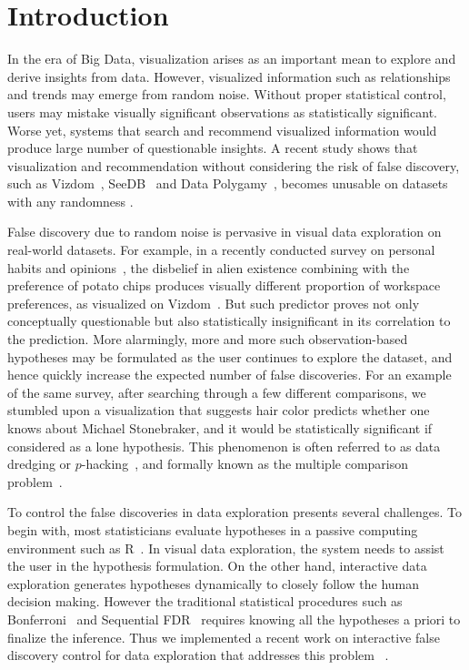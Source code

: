 \section{Introduction}
\label{sec:intro}
 In the era of Big Data, visualization arises as an important mean to explore and derive insights from data.  However, visualized information such as relationships and trends may emerge from random noise.  Without proper statistical control, users may mistake visually significant observations as statistically significant.  Worse yet, systems that search and recommend visualized information would produce large number of questionable insights.  
A recent study shows that visualization and recommendation without considering the risk of false discovery, such as Vizdom~\cite{vizdom}, SeeDB~\cite{seedb} and Data Polygamy~\cite{polygamy}, becomes unusable on datasets with any randomness \cite{towards-sustainable-insight}.

 False discovery due to random noise is pervasive in visual data exploration on real-world datasets. For example, in a recently conducted survey on personal habits and opinions~\cite{towards-sustainable-insight}, the disbelief in alien existence combining with the preference of potato chips produces visually different proportion of workspace preferences, as visualized on Vizdom~\cite{vizdom}.  But such predictor proves not only conceptually questionable but also statistically insignificant in its correlation to the prediction.  More alarmingly, more and more such observation-based hypotheses may be formulated as the user continues to explore the dataset, and hence quickly increase the expected number of false discoveries. For an example of the same survey, after searching through a few different comparisons, we stumbled upon a visualization that suggests hair color predicts whether one knows about Michael Stonebraker, and it would be statistically significant if considered as a lone hypothesis. This phenomenon is often referred to as data dredging or $p$-hacking~\cite{p-hacking}, and formally known as the multiple comparison problem~\cite{shaffer1995multiple}.

To control the false discoveries in data exploration presents several challenges.  To begin with, most statisticians evaluate hypotheses in a passive computing environment such as R~\cite{R}. In visual data exploration, the system needs to assist the user in the hypothesis formulation.  On the other hand, interactive data exploration generates hypotheses dynamically to closely follow the human decision making.  However the traditional statistical procedures such as Bonferroni~\cite{bonferroni1936teoria} and Sequential FDR~\cite{seq-fdr} requires knowing all the hypotheses a priori to finalize the inference.  Thus we implemented a recent work on interactive false discovery control for data exploration that addresses this problem ~\cite{controlling-false-discoveries}.  


